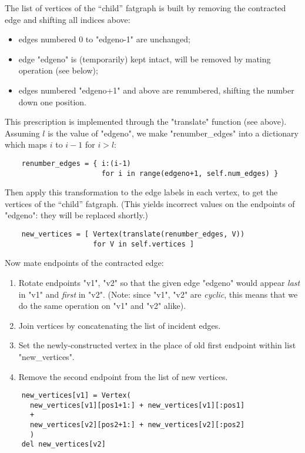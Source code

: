 The list of vertices of the ``child'' fatgraph is built by removing
the contracted edge and shifting all indices above:
\begin{itemize}
\item edges numbered 0 to "edgeno-1" are unchanged;
\item edge "edgeno" is (temporarily) kept intact, will be
  removed by mating operation (see below);
\item edges numbered "edgeno+1" and above are renumbered, 
  shifting the number down one position.
\end{itemize}
This prescription is implemented through the "translate" function (see
above).  Assuming $l$ is the value of "edgeno", we make
"renumber_edges" into a dictionary which maps $i$ to $i-1$ for $i >
l$:
\begin{lstlisting}
    renumber_edges = { i:(i-1)
                       for i in range(edgeno+1, self.num_edges) }
\end{lstlisting}
Then apply this transformation to the edge labels in each vertex, to
get the vertices of the ``child'' fatgraph. (This yields incorrect
values on the endpoints of "edgeno": they will be replaced shortly.)
\begin{lstlisting}
    new_vertices = [ Vertex(translate(renumber_edges, V))
                     for V in self.vertices ]

\end{lstlisting}
Now mate endpoints of the contracted edge:
\begin{enumerate}
\item Rotate endpoints "v1", "v2" so that the given edge "edgeno" would appear
  \emph{last} in "v1" and \emph{first} in "v2". (Note: since "v1", "v2" are
  \emph{cyclic}, this means that we do the same operation on "v1" and "v2"
  alike).
\item Join vertices by concatenating the list of incident
  edges.
\item Set the newly-constructed vertex in the place of old first
  endpoint within list "new_vertices".
\item Remove the second endpoint from the list of new vertices.
\end{enumerate}
\begin{lstlisting}
    new_vertices[v1] = Vertex(
      new_vertices[v1][pos1+1:] + new_vertices[v1][:pos1]
      +
      new_vertices[v2][pos2+1:] + new_vertices[v2][:pos2]
      )
    del new_vertices[v2]

\end{lstlisting}

